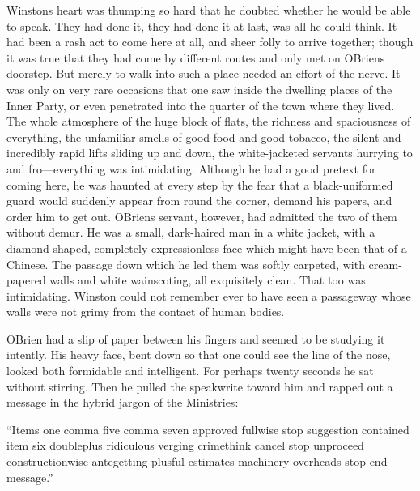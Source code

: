 Winston\textquotesingle s heart was thumping so hard that he doubted
whether he would be able to speak. They had done it, they had done it at
last, was all he could think. It had been a rash act to come here at
all, and sheer folly to arrive together; though it was true that they
had come by different routes and only met on
O\textquotesingle Brien\textquotesingle s doorstep. But merely to walk
into such a place needed an effort of the nerve. It was only on very
rare occasions that one saw inside the dwelling places of the Inner
Party, or even penetrated into the quarter of the town where they lived.
The whole atmosphere of the huge block of flats, the richness and
spaciousness of everything, the unfamiliar smells of good food and good
tobacco, the silent and incredibly rapid lifts sliding up and down, the
white-jacketed servants hurrying to and fro---everything was
intimidating. Although he had a good pretext for coming here, he was
haunted at every step by the fear that a black-uniformed guard would
suddenly appear from round the corner, demand his papers, and order him
to get out. O\textquotesingle Brien\textquotesingle s servant, however,
had admitted the two of them without demur. He was a small, dark-haired
man in a white jacket, with a diamond-shaped, completely expressionless
face which might have been that of a Chinese. The passage down which he
led them was softly carpeted, with cream-papered walls and white
wainscoting, all exquisitely clean. That too was intimidating. Winston
could not remember ever to have seen a passageway whose walls were not
grimy from the contact of human bodies.

O\textquotesingle Brien had a slip of paper between his fingers and
seemed to be studying it intently. His heavy face, bent down so that one
could see the line of the nose, looked both formidable and intelligent.
For perhaps twenty seconds he sat without stirring. Then he pulled the
speakwrite toward him and rapped out a message in the hybrid jargon of
the Ministries:

``Items one comma five comma seven approved fullwise stop suggestion
contained item six doubleplus ridiculous verging crimethink cancel stop
unproceed constructionwise antegetting plusful estimates machinery
overheads stop end message.''

